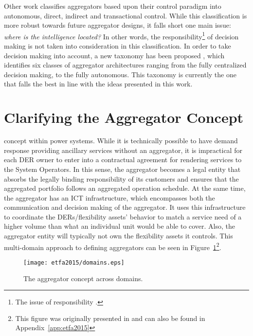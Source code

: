 Other work classifies aggregators based upon their control paradigm into autonomous, direct, indirect and transactional control. While this classification is more robust towards future aggregator designs, it falls short one main issue: \emph{where is the intelligence located?} In other words, the responsibility\footnote{The issue of responsibility .} of decision making is not taken into consideration in this classification. In order to take decision making into account, a new taxonomy has been proposed , which identifies six classes of aggregator architectures ranging from the fully centralized decision making, to the fully autonomous. This taxonomy is currently the one that falls the best in line with the ideas presented in this work.

\section{Clarifying the Aggregator Concept}
 concept within power systems. While it is technically possible to have demand response providing ancillary services without an aggregator, it is impractical for each DER owner to enter into a contractual agreement for rendering services to the System Operators. In this sense, the aggregator becomes a legal entity that absorbs the legally binding responsibility of its customers and ensures that the aggregated portfolio follows an aggregated operation schedule. At the same time, the aggregator has an ICT infrastructure, which encompasses both the communication and decision making of the aggregator. It uses this infrastructure to coordinate the DERs/flexibility assets' behavior to match a service need of a higher volume than what an individual unit would be able to cover. Also, the aggregator entity will typically not own the flexibility assets it controls. This multi-domain approach to defining aggregators can be seen in Figure~\ref{fig:MAINdomains}\footnote{This figure was originally presented in \cite{bondy2015a} and can also be found in Appendix~\ref{app:etfa2015}}.

\begin{figure}[htbp!]
\centering
\texttt{[image: etfa2015/domains.eps]}
\caption{The aggregator concept across domains.}
\label{fig:MAINdomains}
\end{figure}

